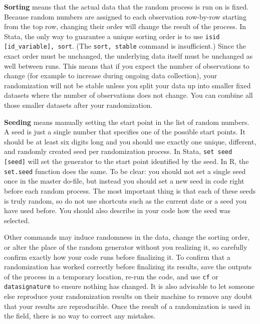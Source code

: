 \textbf{Sorting} means that the actual data that the random process is run on is fixed.
Because random numbers are assigned to each observation row-by-row starting from
the top row,
changing their order will change the result of the process.
In Stata, the only way to guarantee a unique sorting order is to use
\texttt{isid [id\_variable], sort}.
(The \texttt{sort, stable} command is insufficient.)
Since the exact order must be unchanged,
the underlying data itself must be unchanged as well between runs.
This means that if you expect the number of observations to change
(for example to increase during ongoing data collection),
your randomization will not be stable unless you split your data up into
smaller fixed datasets where the number of observations does not change.
You can combine all
those smaller datasets after your randomization.


\textbf{Seeding} means manually setting the start point in the list of random numbers.
A seed is just a single number that specifies one of the possible start points.
It should be at least six digits long and you should use exactly
one unique, different, and randomly created seed per randomization process.
In Stata, \texttt{set seed [seed]} will set the generator
to the start point identified by the seed.
In R, the \texttt{set.seed} function does the same.
To be clear: you should not set a single seed once in the master do-file,
but instead you should set a new seed in code right before each random process.
The most important thing is that each of these seeds is truly random,
so do not use shortcuts such as the current date or a seed you have used before.
You should also describe in your code how the seed was selected.

Other commands may induce randomness in the data,
change the sorting order,
or alter the place of the random generator without you realizing it,
so carefully confirm exactly how your code runs before finalizing it.
To confirm that a randomization has worked correctly before finalizing its results,
save the outputs of the process in a temporary location,
re-run the code, and use \texttt{cf} or \texttt{datasignature} to ensure
nothing has changed. It is also advisable to let someone else reproduce your
randomization results on their machine to remove any doubt that your results
are reproducible.
Once the result of a randomization is used in the field,
there is no way to correct any mistakes.

